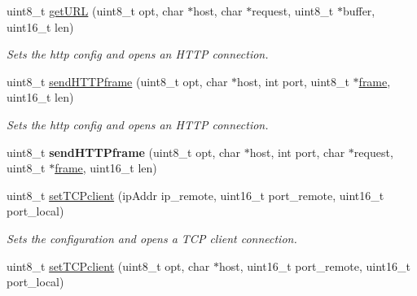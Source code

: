 \begin{DoxyCompactItemize}
\item 
uint8\+\_\+t \hyperlink{class_wasp_w_i_f_i_a49388ab8fc5571a72ebd96d5c8651406}{get\+U\+RL} (uint8\+\_\+t opt, char $\ast$host, char $\ast$request, uint8\+\_\+t $\ast$buffer, uint16\+\_\+t len)
\begin{DoxyCompactList}\small\item\em Sets the http config and opens an H\+T\+TP connection. \end{DoxyCompactList}\item 
uint8\+\_\+t \hyperlink{class_wasp_w_i_f_i_aca7d3ce0724dc498e0c8ef742e353f7d}{send\+H\+T\+T\+Pframe} (uint8\+\_\+t opt, char $\ast$host, int port, uint8\+\_\+t $\ast$\hyperlink{_wasp_frame_8h_a6240aaba878a8368af0eead8dc7759a4}{frame}, uint16\+\_\+t len)
\begin{DoxyCompactList}\small\item\em Sets the http config and opens an H\+T\+TP connection. \end{DoxyCompactList}\item 
uint8\+\_\+t {\bfseries send\+H\+T\+T\+Pframe} (uint8\+\_\+t opt, char $\ast$host, int port, char $\ast$request, uint8\+\_\+t $\ast$\hyperlink{_wasp_frame_8h_a6240aaba878a8368af0eead8dc7759a4}{frame}, uint16\+\_\+t len)\hypertarget{class_wasp_w_i_f_i_ab9c0e51069a47a5025140a07d7b762de}{}\label{class_wasp_w_i_f_i_ab9c0e51069a47a5025140a07d7b762de}

\item 
uint8\+\_\+t \hyperlink{class_wasp_w_i_f_i_ac317491b020c712c4fb88f383529e31d}{set\+T\+C\+Pclient} (ip\+Addr ip\+\_\+remote, uint16\+\_\+t port\+\_\+remote, uint16\+\_\+t port\+\_\+local)
\begin{DoxyCompactList}\small\item\em Sets the configuration and opens a T\+CP client connection. \end{DoxyCompactList}\item 
uint8\+\_\+t \hyperlink{class_wasp_w_i_f_i_a1bd8fb247d4ab83d7cd3c93657e5d705}{set\+T\+C\+Pclient} (uint8\+\_\+t opt, char $\ast$host, uint16\+\_\+t port\+\_\+remote, uint16\+\_\+t port\+\_\+local)\hypertarget{class_wasp_w_i_f_i_a1bd8fb247d4ab83d7cd3c93657e5d705}{}\label{class_wasp_w_i_f_i_a1bd8fb247d4ab83d7cd3c93657e5d705}


\end{DoxyCompactItemize}
